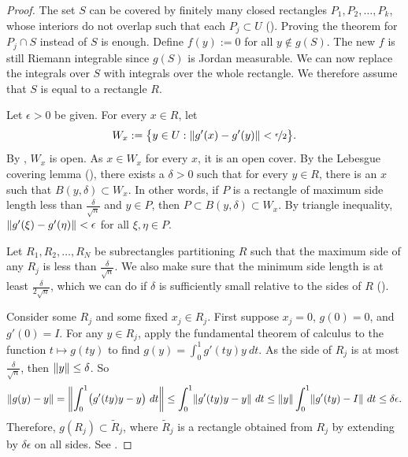 \begin{proof}
The set $S$ can be covered by finitely many closed rectangles
$P_1,P_2,\ldots,P_k$, whose
interiors do not overlap such that each $P_j \subset U$
().
Proving the theorem for $P_j \cap S$ instead of $S$ is enough.
Define $f(y) := 0$ for all $y \notin g(S)$.
The new $f$ is still Riemann integrable since $g(S)$ is Jordan measurable.
We can now replace the integrals over $S$ with integrals over the whole
rectangle.
We therefore assume that $S$ is equal to a rectangle $R$.

Let $\epsilon > 0$ be given.
For every $x \in R$, let
\begin{equation*}
W_x := \bigl\{ y \in U : \lVert {g'(x)-g'(y)} \rVert < \nicefrac{\epsilon}{2} \bigr\} .
\end{equation*}
By ,
$W_x$ is open.
As $x \in W_x$ for every $x$, it is an open cover.
By the Lebesgue covering lemma
(),
there exists a $\delta > 0$ such that
for every $y \in R$, there is an $x$ such that $B(y,\delta) \subset W_x$.
In other words, if $P$ is a rectangle of maximum side length less
than $\frac{\delta}{\sqrt{n}}$ and $y \in P$, then $P \subset
B(y,\delta) \subset W_x$.  By triangle inequality,
$\lVert {g'(\xi)-g'(\eta)} \rVert < \epsilon$ for all $\xi, \eta \in P$.

Let $R_1,R_2,\ldots,R_N$ be subrectangles partitioning $R$ such that
the maximum side of any $R_j$ is less than
$\frac{\delta}{\sqrt{n}}$.
We also make sure that the minimum side length is at least
$\frac{\delta}{2\sqrt{n}}$, which we can do if $\delta$ is 
sufficiently small relative to the sides of $R$ ().

Consider some $R_j$ and some fixed $x_j \in R_j$.
First suppose $x_j=0$, $g(0) = 0$, and $g'(0) = I$.
For any $y \in R_j$,
apply the fundamental theorem of calculus
to the function $t \mapsto g(ty)$ to find
$g(y) = \int_0^1 g'(ty)y ~dt$.  As the
side of $R_j$ is at most $\frac{\delta}{\sqrt{n}}$,
then $\lVert {y} \rVert \leq \delta$.  So
\begin{equation*}
\lVert {g(y)-y} \rVert =
\left\lVert {\int_0^1 \bigl(g'(ty) y - y\bigr) ~dt} \right\rVert \leq
\int_0^1 \lVert {g'(ty) y - y} \rVert ~dt \leq
\lVert {y} \rVert \int_0^1 \lVert {g'(ty) - I} \rVert ~dt
\leq
\delta \epsilon .
\end{equation*}
Therefore, $g(R_j) \subset \widetilde{R}_j$, where
$\widetilde{R}_j$ is a rectangle obtained from
$R_j$ by extending by
$\delta \epsilon$ on all sides.  See .


\end{proof}
